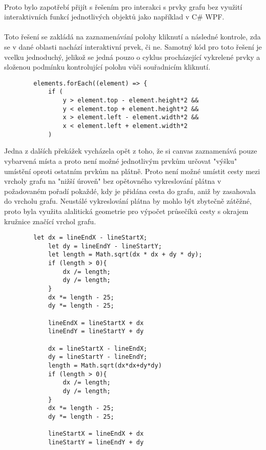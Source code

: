 \documentclass[12pt, titlepage, a4paper]{article}
\begin{document}
\paragraph{}
Proto bylo zapotřebí přijít s řešením pro interakci s prvky grafu bez využití
interaktivních funkcí jednotlivých objektů jako například v C\# WPF. \par
\paragraph{}
Toto řešení se zakládá na zaznamenávání polohy kliknutí a následné kontrole, zda
se v dané oblasti nachází interaktivní prvek, či ne. Samotný kód pro toto řešení
je vcelku jednoduchý, jelikož se jedná pouzo o cyklus procházející vykrelené prvky
a složenou podmínku kontrolující polohu vůči souřadnicím kliknutí. \par
    \begin{lstlisting}
        elements.forEach((element) => {
            if (
                y > element.top - element.height*2 &&
                y < element.top + element.height*2 &&
                x > element.left - element.width*2 &&
                x < element.left + element.width*2
            )
    \end{lstlisting}

Jedna z dalších překážek vycházela opět z toho, že si canvas zaznamenává pouze
vybarvená místa a proto není možné jednotlivým prvkům určovat "výšku" \\ umístění
oproti ostatním prvkům na plátně. Proto není možné umístit cesty mezi vrcholy
grafu na "nižší úroveň" bez opětovného vykreslování plátna v požadovaném pořadí
pokaždé, kdy je přidána cesta do grafu, aniž by zasahovala do vrcholu grafu. 
Neustálé vykreslování plátna by mohlo být zbytečně zátěžné, proto byla využita alalitická
geometrie pro výpočet průsečíků cesty s okrajem kružnice
značící vrchol grafu.\par
\begin{lstlisting}
        let dx = lineEndX - lineStartX;
            let dy = lineEndY - lineStartY;
            let length = Math.sqrt(dx * dx + dy * dy);
            if (length > 0){
                dx /= length;
                dy /= length;
            }
            dx *= length - 25;
            dy *= length - 25;

            lineEndX = lineStartX + dx
            lineEndY = lineStartY + dy

            dx = lineStartX - lineEndX;
            dy = lineStartY - lineEndY;
            length = Math.sqrt(dx*dx+dy*dy)
            if (length > 0){
                dx /= length;
                dy /= length;
            }
            dx *= length - 25;
            dy *= length - 25;

            lineStartX = lineEndX + dx
            lineStartY = lineEndY + dy
\end{lstlisting}
\end{document}
